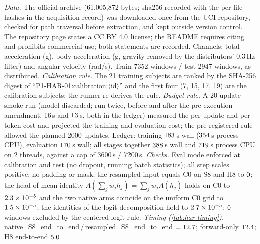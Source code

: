 \documentclass{article}
\theoremstyle{plain}
\theoremstyle{definition}
\theoremstyle{remark}
\begin{document}
\emph{Data.} The official archive (61,005,872 bytes; sha256 recorded with the per-file hashes in the acquisition record) was downloaded once from the UCI repository, checked for path traversal before extraction, and kept outside version control. The repository page states a CC BY 4.0 license; the README requires citing \citet{anguita2013har} and prohibits commercial use; both statements are recorded. Channels: total acceleration (g), body acceleration (g, gravity removed by the distributors' 0.3\,Hz filter) and angular velocity (rad/s). Train 7352 windows / test 2947 windows, as distributed.
\emph{Calibration rule.} The 21 training subjects are ranked by the SHA-256 digest of ``P1-HAR-01:calibration:$\langle$id$\rangle$'' and the first four (7, 15, 17, 19) are the calibration subjects; the runner re-derives the rule.
\emph{Budget rule.} A 20-update smoke run (model discarded; run twice, before and after the pre-execution amendment, 16\,s and $13$\,s, both in the ledger) measured the per-update and per-token cost and projected the training and evaluation cost; the pre-registered rule allowed the planned 2000 updates. Ledger: training $183$\,s wall ($354$\,s process CPU), evaluation $170$\,s wall; all stages together $388$\,s wall and $719$\,s process CPU on 2 threads, against a cap of 3600\,s / 7200\,s.
\emph{Checks.} Eval mode enforced at calibration and test (no dropout, running batch statistics); all step scales positive; no padding or mask; the resampled input equals C0 on S8 and H8 to $0$; the head-of-mean identity $A(\sum_jw_jh_j)=\sum_jw_jA(h_j)$ holds on C0 to $2.3\times10^{-5}$ and the two native arms coincide on the uniform C0 grid to $1.5\times10^{-5}$; the identities of the logit decomposition hold to $2.7\times10^{-5}$; $0$ windows excluded by the centered-logit rule.
\emph{Timing (\cref{tab:har-timing}).} native\_S8\_end\_to\_end\,/\,resampled\_S8\_end\_to\_end $=12.7$; forward-only $12.4$; H8 end-to-end $5.0$.
\end{document}
